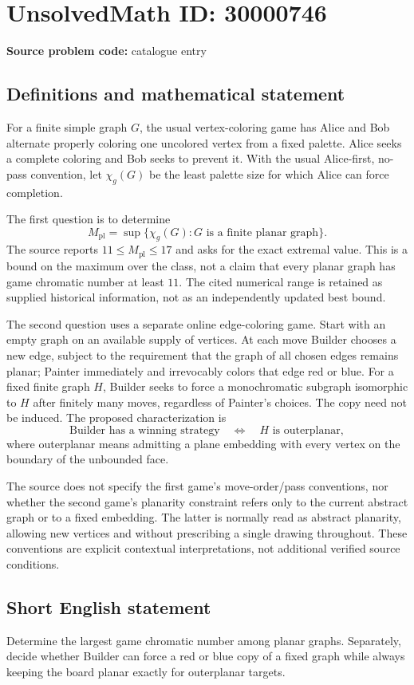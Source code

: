 \documentclass[11pt]{article}
\begin{document}
\section*{UnsolvedMath ID: 30000746}
\textbf{Source problem code:} catalogue entry
\subsection{Definitions and mathematical statement}
For a finite simple graph $G$, the usual vertex-coloring game has Alice and Bob alternate properly coloring one uncolored vertex from a fixed palette. Alice seeks a complete coloring and Bob seeks to prevent it. With the usual Alice-first, no-pass convention, let $\chi_g(G)$ be the least palette size for which Alice can force completion.

The first question is to determine
\[
M_{\mathrm{pl}}=\sup\{\chi_g(G):G\text{ is a finite planar graph}\}.
\]
The source reports $11\leq M_{\mathrm{pl}}\leq17$ and asks for the exact extremal value. This is a bound on the maximum over the class, not a claim that every planar graph has game chromatic number at least $11$. The cited numerical range is retained as supplied historical information, not as an independently updated best bound.

The second question uses a separate online edge-coloring game. Start with an empty graph on an available supply of vertices. At each move Builder chooses a new edge, subject to the requirement that the graph of all chosen edges remains planar; Painter immediately and irrevocably colors that edge red or blue. For a fixed finite graph $H$, Builder seeks to force a monochromatic subgraph isomorphic to $H$ after finitely many moves, regardless of Painter's choices. The copy need not be induced. The proposed characterization is
\[
\text{Builder has a winning strategy}\quad\Longleftrightarrow\quad
H\text{ is outerplanar},
\]
where outerplanar means admitting a plane embedding with every vertex on the boundary of the unbounded face.

The source does not specify the first game's move-order/pass conventions, nor whether the second game's planarity constraint refers only to the current abstract graph or to a fixed embedding. The latter is normally read as abstract planarity, allowing new vertices and without prescribing a single drawing throughout. These conventions are explicit contextual interpretations, not additional verified source conditions.
\subsection{Short English statement}
Determine the largest game chromatic number among planar graphs. Separately, decide whether Builder can force a red or blue copy of a fixed graph while always keeping the board planar exactly for outerplanar targets.
\end{document}
